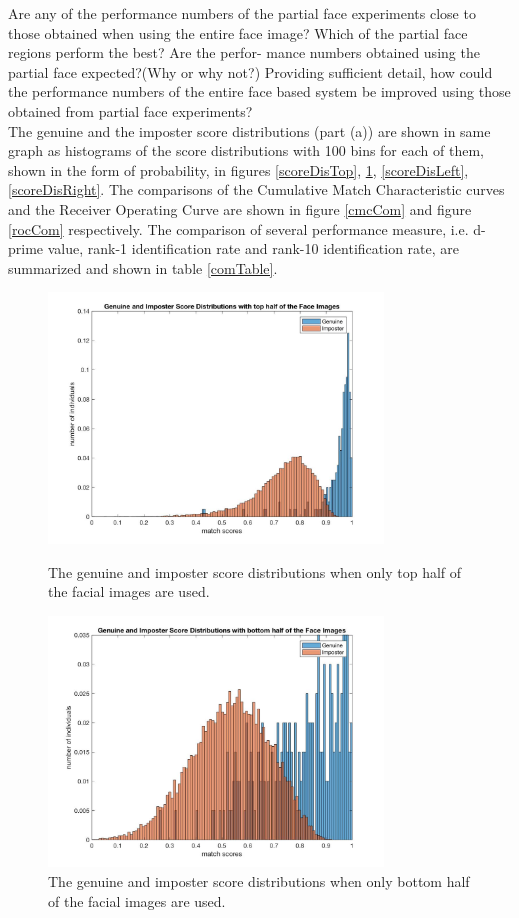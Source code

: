 \documentclass[a4paper]{article}
\begin{document}
\begin{spacing}{2.0}
	Are any of the performance numbers of the partial face experiments close to those obtained when using the entire face image? Which of the partial face regions perform the best? Are the perfor- mance numbers obtained using the partial face expected?(Why or why not?) Providing sufficient detail, how could the performance numbers of the entire face based system be improved using those obtained from partial face experiments?\\
	
	The genuine and the imposter score distributions (part (a)) are shown in same graph as histograms of 	the  score distributions with 100 bins for each of them, shown in the form of probability, in figures 		\ref{scoreDisTop}, \ref{scoreDisBottom}, \ref{scoreDisLeft}, \ref{scoreDisRight}. The comparisons of the Cumulative Match Characteristic curves and the Receiver Operating Curve are shown in figure 	\ref{cmcCom} and figure \ref{rocCom} respectively. The comparison of several performance measure, i.e. d-prime value, rank-1 identification rate and rank-10 identification rate, are summarized and shown in table \ref{comTable}.
	
	\begin{figure}[!htb]
	\begin{minipage}[t]{0.5\linewidth}
	\centering
	\includegraphics[width = 3.5in]{top_scoreDis.jpg}
	\caption{The genuine and imposter score distributions when only top half of the facial images are used.}
	\label{scoreDisTop}
	\end{minipage}
	\begin{minipage}[t]{0.5\linewidth}
	\centering
	\includegraphics[width = 3.5in]{bottom_scoreDis.jpg}
	\caption{The genuine and imposter score distributions when only bottom half of the facial images are used.}
	\label{scoreDisBottom}
	\end{minipage}
	\end{figure}	
	

\end{spacing}
\end{document}
